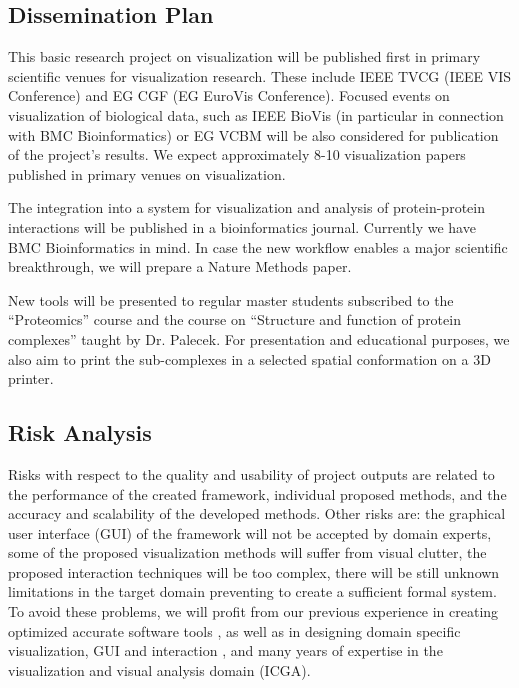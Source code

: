 \documentclass[11pt,a4paper,titlepage,oneside,onecolumn]{article}
\begin{document}
\subsection{Dissemination Plan}
\vspace{-4mm}
This basic research project on visualization will be published first in primary scientific venues for visualization research. These include IEEE TVCG (IEEE VIS Conference) and EG CGF (EG EuroVis Conference). Focused events on visualization of biological data, such as IEEE BioVis (in particular in connection with BMC Bioinformatics) or EG VCBM will be also considered for publication of the project's results. We expect approximately 8-10 visualization papers published in primary venues on visualization.

The integration into a system for visualization and analysis of protein-protein interactions will be published in a bioinformatics journal. Currently we have BMC Bioinformatics in mind. In case the new workflow enables a major scientific breakthrough, we will prepare a Nature Methods paper. 


New tools will be presented to regular master students subscribed to the “Proteomics” course and the course on “Structure and function of protein complexes” taught by Dr. Palecek. For presentation and educational purposes, we also aim to print the sub-complexes in a selected spatial conformation on a 3D printer. 

\subsection{Risk Analysis}
\vspace{-4mm}
Risks with respect to the quality and usability of project outputs are related to the performance of the created framework,  individual proposed methods, and the accuracy and scalability of the developed methods. Other risks are: the graphical user interface (GUI) of the framework will not be accepted by domain experts, some of the proposed visualization methods will suffer from visual clutter, the proposed interaction techniques will be too complex, there will be still unknown limitations in the target domain preventing to create a sufficient formal system.
To avoid these problems, we will profit from our previous experience in creating optimized accurate software tools \cite{caver}, as well as in designing domain specific visualization, GUI and interaction \cite{analyst}, and many years of expertise in the visualization and visual analysis domain (ICGA). 
\end{document}
